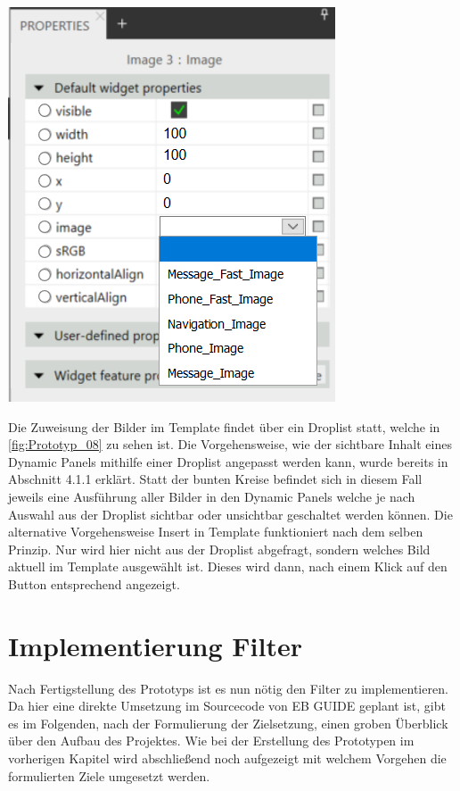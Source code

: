 \begin{center}
  \includegraphics[scale=0.6]{figures/Prototyp_08.PNG}
  \label{fig:Prototyp_08}
\end{center}

Die Zuweisung der Bilder im Template findet über ein Droplist statt, welche in \cref{fig:Prototyp_08} zu sehen ist.
Die Vorgehensweise, wie der sichtbare Inhalt eines Dynamic Panels mithilfe einer Droplist angepasst werden kann, wurde bereits in Abschnitt 4.1.1 erklärt.
Statt der bunten Kreise befindet sich in diesem Fall jeweils eine Ausführung aller Bilder in den Dynamic Panels welche je nach Auswahl aus der Droplist sichtbar oder unsichtbar geschaltet werden können.
Die alternative Vorgehensweise \glqq Insert in Template\grqq{} funktioniert nach dem selben Prinzip.
Nur wird hier nicht aus der Droplist abgefragt, sondern welches Bild aktuell im Template ausgewählt ist.
Dieses wird dann, nach einem Klick auf den Button entsprechend angezeigt.


\section {Implementierung Filter}
Nach Fertigstellung des Prototyps ist es nun nötig den Filter zu implementieren.
Da hier eine direkte Umsetzung im Sourcecode von EB GUIDE geplant ist, gibt es im Folgenden, nach der Formulierung der Zielsetzung,  einen groben Überblick über den Aufbau des Projektes.
Wie bei der Erstellung des Prototypen im vorherigen Kapitel wird abschließend noch aufgezeigt mit welchem Vorgehen die formulierten Ziele umgesetzt werden.

